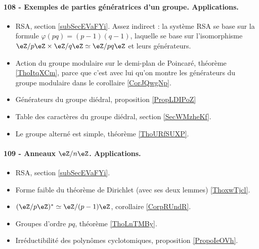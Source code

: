 \paragraph{108 - Exemples de parties génératrices d’un groupe. Applications.}
\begin{itemize}
    \item RSA, section \ref{subSecEVaFYi}. Assez indirect : la système RSA se base sur la formule \( \varphi(pq)=(p-1)(q-1)\), laquelle se base sur l'isomorphisme \( \eZ/p\eZ\times \eZ/q\eZ\simeq \eZ/pq\eZ\) et leurs générateurs.
    \item Action du groupe modulaire sur le demi-plan de Poincaré, théorème \ref{ThoItqXCm}, parce que c'est avec lui qu'on montre les générateurs du groupe modulaire dans le corollaire \ref{CorJQwgNp}.
    \item Générateurs du groupe diédral, proposition \ref{PropLDIPoZ}
    \item Table des caractères du groupe diédral, section \ref{SecWMzheKf}.
    \item Le groupe alterné est simple, théorème \ref{ThoURfSUXP}.
\end{itemize}

\paragraph{109 - Anneaux $\eZ/n\eZ$. Applications.}
\begin{itemize}
    \item RSA, section \ref{subSecEVaFYi}.
    \item Forme faible du théorème de Dirichlet (avec ses deux lemmes) \ref{ThoxwTjcl}.
    \item \( (\eZ/p\eZ)^*\simeq \eZ/(p-1)\eZ\), corollaire \ref{CorpRUndR}.
    \item Groupes d'ordre \( pq\), théorème \ref{ThoLnTMBy}.
    \item Irréductibilité des polynômes cyclotomiques, proposition \ref{PropoIeOVh}.
\end{itemize}


